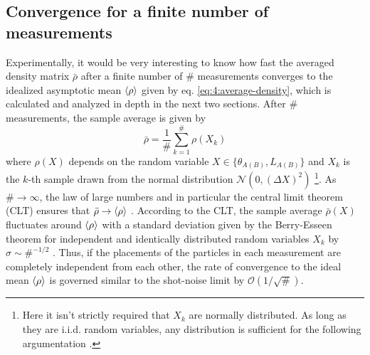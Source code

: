 \subsection*{Convergence for a finite number of measurements}
Experimentally, it would be very interesting to know how fast the averaged density matrix $\bar{\rho}$ after a finite number of $\#$ measurements converges to the idealized asymptotic mean $\left\langle\rho\right\rangle$ given by eq. \eqref{eq:4:average-density}, which is calculated and analyzed in depth in the next two sections.
After $\#$ measurements, the sample average is given by
\begin{equation}
  \bar{\rho} = \frac{1}{\#} \sum_{k=1}^{\#} \rho(X_k)
\end{equation}
where $\rho(X)$ depends on the random variable $X \in \{\theta_{A(B)}, L_{A(B)}\}$ and $X_k$ is the $k$-th sample drawn from the normal distribution $\mathcal{N}(0, (\Delta X)^2)$ \footnote{Here it isn't strictly required that $X_k$ are normally distributed. As long as they are i.i.d. random variables, any distribution is sufficient for the following argumentation \cite[p. 1195]{Riley_2018}.}.
As $\# \rightarrow \infty$, the law of large numbers and in particular the central limit theorem (CLT) ensures that $\bar{\rho} \rightarrow \left\langle\rho\right\rangle$ \cite[p. 1195]{Riley_2018}.
According to the CLT, the sample average $\bar{\rho}(X)$ fluctuates around $\left\langle\rho\right\rangle$ with a standard deviation given by the Berry-Esseen theorem for independent and identically distributed random variables $X_k$ by $\sigma \sim \#^{-1/2}$ \cite{Berry_1941}.
Thus, if the placements of the particles in each measurement are completely independent from each other, the rate of convergence to the ideal mean $\left\langle\rho\right\rangle$ is governed similar to the shot-noise limit by $\mathcal{O}(1/\sqrt{\#})$.

